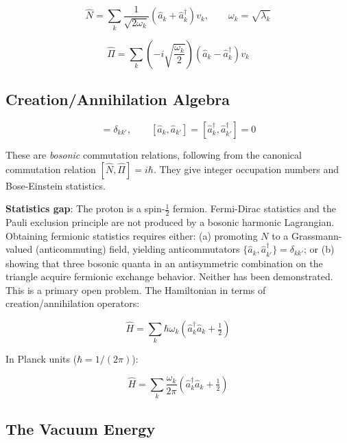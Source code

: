 \documentclass[11pt,letterpaper]{article}
\begin{document}
\begin{equation}
\hat{N} = \sum_k \frac{1}{\sqrt{2\omega_k}} \left(\hat{a}_k + \hat{a}^\dagger_k\right) v_k, \qquad \omega_k = \sqrt{\lambda_k}
\end{equation}

\begin{equation}
\hat{\Pi} = \sum_k \left(-i\sqrt{\frac{\omega_k}{2}}\right)\left(\hat{a}_k - \hat{a}^\dagger_k\right) v_k
\end{equation}

\subsection{Creation/Annihilation Algebra}
\label{sec:org37d7d47}

\begin{equation}
[\hat{a}_k, \hat{a}^\dagger_{k'}] = \delta_{kk'}, \qquad [\hat{a}_k, \hat{a}_{k'}] = [\hat{a}^\dagger_k, \hat{a}^\dagger_{k'}] = 0
\end{equation}

These are \textit{bosonic} commutation relations, following from the canonical commutation relation \([\hat{N}, \hat{\Pi}] = i\hbar\). They give integer occupation numbers and Bose-Einstein statistics.

\textbf{Statistics gap}: The proton is a spin-\(\tfrac{1}{2}\) fermion. Fermi-Dirac statistics and the Pauli exclusion principle are not produced by a bosonic harmonic Lagrangian. Obtaining fermionic statistics requires either: (a) promoting \(N\) to a Grassmann-valued (anticommuting) field, yielding anticommutators \(\{\hat{a}_k, \hat{a}^\dagger_{k'}\} = \delta_{kk'}\); or (b) showing that three bosonic quanta in an antisymmetric combination on the triangle acquire fermionic exchange behavior. Neither has been demonstrated. This is a primary open problem. The Hamiltonian in terms of creation/annihilation operators:

\begin{equation}
\hat{H} = \sum_k \hbar\omega_k \left(\hat{a}^\dagger_k \hat{a}_k + \tfrac{1}{2}\right)
\end{equation}

In Planck units (\(\hbar = 1/(2\pi)\)):

\begin{equation}
\hat{H} = \sum_k \frac{\omega_k}{2\pi} \left(\hat{a}^\dagger_k \hat{a}_k + \tfrac{1}{2}\right)
\end{equation}

\subsection{The Vacuum Energy}
\label{sec:org3b318be}
\end{document}
